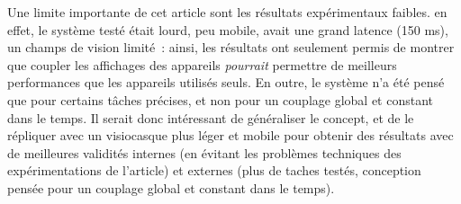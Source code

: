 Une limite importante de cet article sont les résultats expérimentaux faibles. en effet, le système testé était lourd, peu mobile, avait une grand latence (150 ms), un champs de vision limité~: ainsi, les résultats ont seulement permis de montrer que coupler les affichages des appareils \emph{pourrait} permettre de meilleurs performances que les appareils utilisés seuls. En outre, le système n'a été pensé que pour certains tâches précises, et non pour un couplage global et constant dans le temps. Il serait donc intéressant de généraliser le concept, et de le répliquer avec un visiocasque plus léger et mobile pour obtenir des résultats avec de meilleures validités internes (en évitant les problèmes techniques des expérimentations de l'article) et externes (plus de taches testés, conception pensée pour un couplage global et constant dans le temps).


